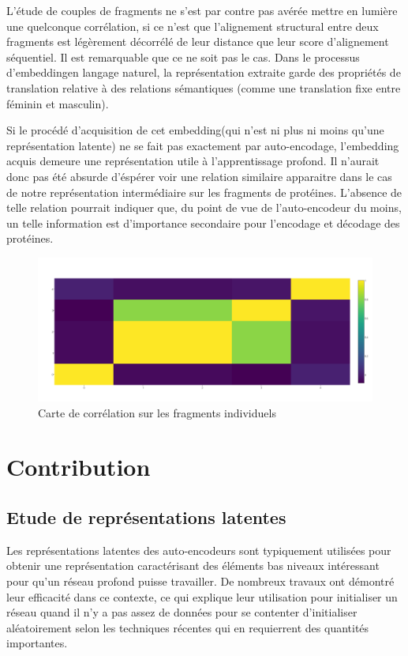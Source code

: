 \documentclass[a4paper, 11pt, onecolumn]{article}
\begin{document}
L'étude de couples de fragments ne s'est par contre pas avérée mettre en lumière
une quelconque corrélation, si ce n'est que l'alignement structural entre deux
fragments est légèrement décorrélé de leur distance que leur score d'alignement
séquentiel. Il est remarquable que ce ne soit pas le cas. Dans le processus \og
d'embedding\fg en langage naturel, la représentation extraite garde des
propriétés de translation relative à des relations sémantiques (comme une
translation fixe entre féminin et masculin). 

Si le procédé d'acquisition de cet
\og embedding\fg (qui n'est ni plus ni moins qu'une représentation latente) ne
se fait pas exactement par auto-encodage, l'embedding acquis demeure une
représentation utile à l'apprentissage profond.  Il n'aurait donc pas été
absurde d'éspérer voir une relation similaire apparaitre dans le cas de notre
représentation intermédiaire sur les fragments de protéines. L'absence de telle
relation pourrait indiquer que, du point de vue de l'auto-encodeur du moins, un
telle information est d'importance secondaire pour l'encodage et décodage des protéines.

\begin{figure}
  \centering
  \includegraphics[scale=0.3]{PairOneRecHeat}
  \caption{Carte de corrélation sur les fragments individuels}
\end{figure}

\section{Contribution}

\subsection{Etude de représentations latentes}

Les représentations latentes des auto-encodeurs sont typiquement utilisées pour
obtenir une représentation caractérisant des éléments bas niveaux intéressant
pour qu'un réseau profond puisse travailler. De nombreux travaux ont démontré
leur efficacité dans ce contexte, ce qui explique leur utilisation pour
initialiser un réseau quand il n'y a pas assez de données pour se contenter
d'initialiser aléatoirement selon les techniques récentes qui en requierrent des
quantités importantes.
\end{document}
